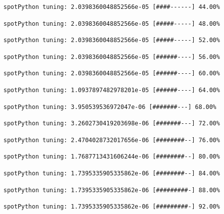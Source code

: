 \documentclass[
  letterpaper,
  DIV=11,
  numbers=noendperiod]{scrreprt}
\begin{document}
\begin{verbatim}
spotPython tuning: 2.0398360048852566e-05 [####------] 44.00% 
\end{verbatim}

\begin{verbatim}
spotPython tuning: 2.0398360048852566e-05 [#####-----] 48.00% 
\end{verbatim}

\begin{verbatim}
spotPython tuning: 2.0398360048852566e-05 [#####-----] 52.00% 
\end{verbatim}

\begin{verbatim}
spotPython tuning: 2.0398360048852566e-05 [######----] 56.00% 
\end{verbatim}

\begin{verbatim}
spotPython tuning: 2.0398360048852566e-05 [######----] 60.00% 
\end{verbatim}

\begin{verbatim}
spotPython tuning: 1.0937897482978201e-05 [######----] 64.00% 
\end{verbatim}

\begin{verbatim}
spotPython tuning: 3.950539536972047e-06 [#######---] 68.00% 
\end{verbatim}

\begin{verbatim}
spotPython tuning: 3.2602730419203698e-06 [#######---] 72.00% 
\end{verbatim}

\begin{verbatim}
spotPython tuning: 2.4704028732017656e-06 [########--] 76.00% 
\end{verbatim}

\begin{verbatim}
spotPython tuning: 1.7687713431606244e-06 [########--] 80.00% 
\end{verbatim}

\begin{verbatim}
spotPython tuning: 1.7395335905335862e-06 [########--] 84.00% 
\end{verbatim}

\begin{verbatim}
spotPython tuning: 1.7395335905335862e-06 [#########-] 88.00% 
\end{verbatim}

\begin{verbatim}
spotPython tuning: 1.7395335905335862e-06 [#########-] 92.00% 
\end{verbatim}
\end{document}
